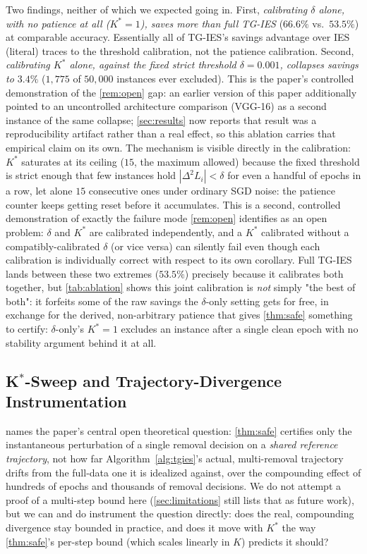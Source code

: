 \documentclass{article}
\theoremstyle{plain}
\theoremstyle{definition}
\theoremstyle{remark}
\begin{document}
Two findings, neither of which we expected going in. First, \emph{calibrating $\delta$ alone, with no patience at all ($K^*{=}1$), saves more than full TG-IES} ($66.6\%$ vs.\ $53.5\%$) at comparable accuracy. Essentially all of TG-IES's savings advantage over IES (literal) traces to the threshold calibration, not the patience calibration. Second, \emph{calibrating $K^*$ alone, against the fixed strict threshold $\delta{=}0.001$, collapses savings to $3.4\%$} ($1{,}775$ of $50{,}000$ instances ever excluded). This is the paper's controlled demonstration of the \cref{rem:open} gap: an earlier version of this paper additionally pointed to an uncontrolled architecture comparison (VGG-16) as a second instance of the same collapse; \cref{sec:results} now reports that result was a reproducibility artifact rather than a real effect, so this ablation carries that empirical claim on its own. The mechanism is visible directly in the calibration: $K^*$ saturates at its ceiling ($15$, the maximum allowed) because the fixed threshold is strict enough that few instances hold $|\Delta^2 L_i|<\delta$ for even a handful of epochs in a row, let alone $15$ consecutive ones under ordinary SGD noise: the patience counter keeps getting reset before it accumulates. This is a second, controlled demonstration of exactly the failure mode \cref{rem:open} identifies as an open problem: $\delta$ and $K^*$ are calibrated independently, and a $K^*$ calibrated without a compatibly-calibrated $\delta$ (or vice versa) can silently fail even though each calibration is individually correct with respect to its own corollary. Full TG-IES lands between these two extremes ($53.5\%$) precisely because it calibrates both together, but \cref{tab:ablation} shows this joint calibration is \emph{not} simply "the best of both": it forfeits some of the raw savings the $\delta$-only setting gets for free, in exchange for the derived, non-arbitrary patience that gives \cref{thm:safe} something to certify: $\delta$-only's $K^*{=}1$ excludes an instance after a single clean epoch with no stability argument behind it at all.

\subsection{K\texorpdfstring{$^*$}{*}-Sweep and Trajectory-Divergence Instrumentation}
\label{sec:kstartraj}

 names the paper's central open theoretical question: \cref{thm:safe} certifies only the instantaneous perturbation of a single removal decision on a \emph{shared reference trajectory}, not how far Algorithm~\ref{alg:tgies}'s actual, multi-removal trajectory drifts from the full-data one it is idealized against, over the compounding effect of hundreds of epochs and thousands of removal decisions. We do not attempt a proof of a multi-step bound here (\cref{sec:limitations} still lists that as future work), but we can and do instrument the question directly: does the real, compounding divergence stay bounded in practice, and does it move with $K^*$ the way \cref{thm:safe}'s per-step bound (which scales linearly in $K$) predicts it should?
\end{document}
